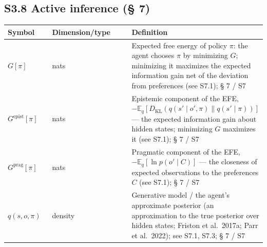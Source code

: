 \documentclass[pdflatex,sn-mathphys-ay]{sn-jnl}
\begin{document}
\subsection*{S3.8 Active inference (§ 7)}\label{s3.8-active-inference-7}



\begin{center}\small
\begin{tabular}{@{} >{\raggedright\arraybackslash}p{0.2105\linewidth} >{\raggedright\arraybackslash}p{0.4474\linewidth} >{\raggedright\arraybackslash}p{0.3421\linewidth}@{}}
\toprule

\begin{minipage}[b]{\linewidth}\raggedright

Symbol

\end{minipage} & \begin{minipage}[b]{\linewidth}\raggedright

Dimension/type

\end{minipage} & \begin{minipage}[b]{\linewidth}\raggedright

Definition

\end{minipage} \\

\midrule

\(G[\pi]\) & nats & Expected free energy of policy \(\pi\): the agent chooses \(\pi\) by minimizing \(G\); minimizing it maximizes the expected information gain net of the deviation from preferences (see S7.1); § 7 / S7 \\

\(G^{\text{epist}}[\pi]\) & nats & Epistemic component of the EFE, \(-\mathbb{E}_q[D_{\text{KL}}(q(s'\mid o',\pi)\|q(s'\mid\pi))]\) --- the expected information gain about hidden states; minimizing \(G\) maximizes it (see S7.1); § 7 / S7 \\

\(G^{\text{prag}}[\pi]\) & nats & Pragmatic component of the EFE, \(-\mathbb{E}_q[\ln p(o'\mid C)]\) --- the closeness of expected observations to the preferences \(C\) (see S7.1); § 7 / S7 \\

\(q(s, o, \pi)\) & density & Generative model / the agent's approximate posterior (an approximation to the true posterior over hidden states; Friston et al.~2017a; Parr et al.~2022); see S7.1, S7.3; § 7 / S7 \\


\end{tabular}
\end{center}
\end{document}

